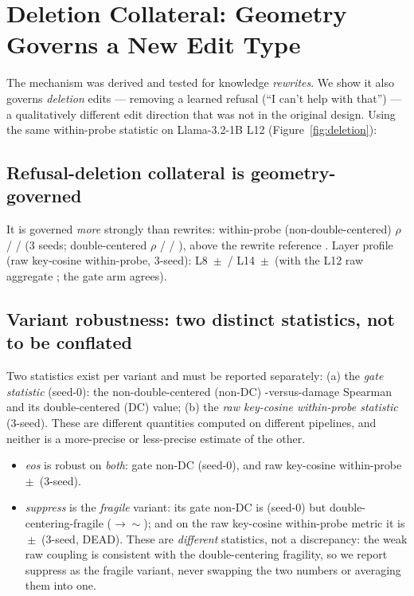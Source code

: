 \section{Deletion Collateral: Geometry Governs a New Edit Type}
\label{sec:deletion}

The mechanism was derived and tested for knowledge \emph{rewrites}. We show
it also governs \emph{deletion} edits --- removing a learned refusal
(``I can't help with that'') --- a qualitatively different edit direction
that was not in the original design. Using the same within-probe statistic
on Llama-3.2-1B L12 (Figure~\ref{fig:deletion}):



\subsection{Refusal-deletion collateral is geometry-governed}
It is governed \emph{more} strongly than rewrites: within-probe
(non-double-centered) $\rho$ \delRefNonDCa{} / \delRefNonDCb{} /
\delRefNonDCc{} (3 seeds; double-centered $\rho$ \delRefDCa{} /
\delRefDCb{} / \delRefDCc{}), above the rewrite reference \rewriteRef{}.
Layer profile (raw key-cosine within-probe, 3-seed): L8
\delRefLeight{}\,$\pm$\,\delRefLeightSD{} / L14
\delRefLfourteen{}\,$\pm$\,\delRefLfourteenSD{} (with the L12 raw aggregate
\delRefAgg{}; the gate \SxC{} arm agrees).

\subsection{Variant robustness: two distinct statistics, not to be conflated}
Two statistics exist per variant and must be reported separately: (a) the
\emph{gate \SxC{} statistic} (seed-0): the non-double-centered (non-DC)
\SxC{}-versus-damage Spearman and its double-centered (DC) value; (b) the
\emph{raw key-cosine within-probe statistic} (3-seed). These are different
quantities computed on different pipelines, and neither is a more-precise
or less-precise estimate of the other.
\begin{itemize}
\item \emph{eos} is robust on \emph{both}: gate non-DC \SxC{}
  \eosGateSxC{} (seed-0), and raw key-cosine within-probe
  \eosRaw{}\,$\pm$\,\eosRawSD{} (3-seed).
\item \emph{suppress} is the \emph{fragile} variant: its gate non-DC
  \SxC{} is \suppressGateSxC{} (seed-0) but double-centering-fragile
  ($\rightarrow\sim$\suppressGateDC{}); and on the raw key-cosine
  within-probe metric it is \suppressRaw{}\,$\pm$\,\suppressRawSD{}
  (3-seed, DEAD). These are \emph{different} statistics, not a discrepancy:
  the weak raw coupling is consistent with the double-centering fragility,
  so we report suppress as the fragile variant, never swapping the two
  numbers or averaging them into one.
\end{itemize}

